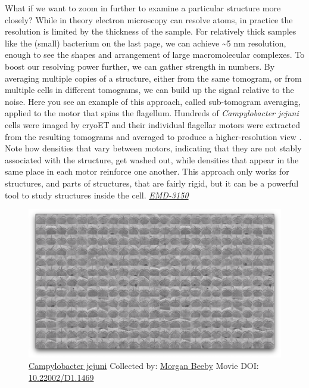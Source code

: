 \documentclass[]{tufte-book}
\begin{document}
What if we want to zoom in further to examine a particular structure
more closely? While in theory electron microscopy can resolve atoms, in
practice the resolution is limited by the thickness of the sample. For
relatively thick samples like the (small) bacterium on the last page, we
can achieve \textasciitilde{}5 nm resolution, enough to see the shapes
and arrangement of large macromolecular complexes. To boost our
resolving power further, we can gather strength in numbers. By averaging
multiple copies of a structure, either from the same tomogram, or from
multiple cells in different tomograms, we can build up the signal
relative to the noise. Here you see an example of this approach, called
sub-tomogram averaging, applied to the motor that spins the flagellum.
Hundreds of \emph{Campylobacter jejuni} cells were imaged by cryoET and
their individual flagellar motors were extracted from the resulting
tomograms and averaged to produce a higher-resolution view
\citep{beeby2016}. Note how densities that vary between motors,
indicating that they are not stably associated with the structure, get
washed out, while densities that appear in the same place in each motor
reinforce one another. This approach only works for structures, and
parts of structures, that are fairly rigid, but it can be a powerful
tool to study structures inside the cell.
\href{https://www.ebi.ac.uk/pdbe/entry/emdb/emd-3150}{\emph{EMD-3150}}





\begin{figure}
\includegraphics{movie_stills/1_7} \caption[\protect\hyperlink{tree}{Campylobacter jejuni} Collected by:
\protect\hyperlink{morgan_beeby}{Morgan Beeby} Movie DOI:
\href{https://doi.org/10.22002/D1.1469}{10.22002/D1.1469}]{\protect\hyperlink{tree}{Campylobacter jejuni} Collected by:
\protect\hyperlink{morgan_beeby}{Morgan Beeby} Movie DOI:
\href{https://doi.org/10.22002/D1.1469}{10.22002/D1.1469}}\label{fig:1-7}
\end{figure}
\end{document}
